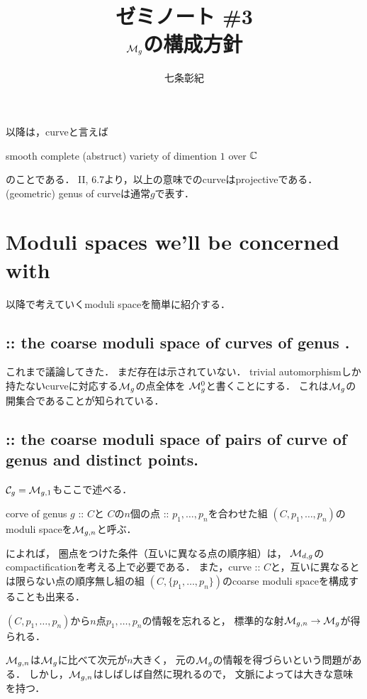 \documentclass[a4paper]{jsarticle}
\begin{document}
\title{ゼミノート \#3 \\ $\mathcal{M}_g$の構成方針 }
\author{七条彰紀}
\maketitle
    以降は，curveと言えば
    \begin{center}
        smooth complete (abstruct) variety of dimention $1$ over $\mathbb{C}$
    \end{center}
    のことである．
    \cite{HarAG} II, 6.7より，以上の意味でのcurveはprojectiveである．
    (geometric) genus of curveは通常$g$で表す．

\section{ Moduli spaces we'll be concerned with }
    以降で考えていくmoduli spaceを簡単に紹介する．

    \subsection{
        :: the coarse moduli space of curves of genus . }
    これまで議論してきた．
    まだ存在は示されていない．
    trivial automorphismしか持たないcurveに対応する$\mathcal{M}_g$の点全体を
    $\mathcal{M}_g^0$と書くことにする．
    これは$\mathcal{M}_g$の開集合であることが知られている．

    \subsection{
        :: the coarse moduli space of pairs of curve of genus  and  distinct points. }
    $\mathcal{C}_g=\mathcal{M}_{g,1}$もここで述べる．

    corve of genus $g$ :: $C$と
    $C$の$n$個の点 :: $p_1,\dots, p_n$を合わせた組
    $(C, p_1,\dots, p_n)$のmoduli spaceを$\mathcal{M}_{g,n}$と呼ぶ．

    \cite{HaMo}によれば，
    圏点をつけた条件（互いに異なる点の順序組）は，
    $\mathcal{M}_{d,g}$のcompactificationを考える上で必要である．
    また，curve :: $C$と，互いに異なるとは限らない点の順序無し組の組
    $(C, \{p_1,\dots,p_n\})$のcoarse moduli spaceを構成することも出来る．

    $(C, p_1,\dots,p_n)$から$n$点$p_1,\dots,p_n$の情報を忘れると，
    標準的な射$\mathcal{M}_{g,n} \to \mathcal{M}_g$が得られる．

    $\mathcal{M}_{g,n}$は$\mathcal{M}_g$に比べて次元が$n$大きく，
    元の$\mathcal{M}_g$の情報を得づらいという問題がある．
    しかし，$\mathcal{M}_{g,n}$はしばしば自然に現れるので，
    文脈によっては大きな意味を持つ．
\end{document}
